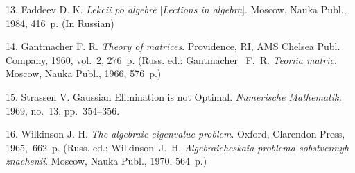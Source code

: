 {13. Faddeev D. K. \emph{Lekcii po algebre $[$Lections in
algebra$]$}. Moscow, Nauka Publ., 1984, 416~p. (In Russian)

14. Gantmacher F. R. {\it Theory of matrices}. Providence, RI, AMS
Chelsea Publ. Company, 1960, vol.~2, 276~p. (Russ. ed.:
Gantmacher~ F.~R. {\it Teoriia matric}. Moscow, Nauka Publ., 1966,
576~p.)

15. Strassen V. Gaussian Elimination is not Optimal.
\emph{Numerische Mathematik.} 1969, no.~13, pp.~354--356.

16. Wilkinson J. H. {\it The algebraic eigenvalue problem}.
Oxford, Clarendon Press, 1965,~662~p. (Russ. ed.: Wilkinson~J.~H.
{\it Algebraicheskaia problema sobstvennyh znachenii}. Moscow,
Nauka Publ., 1970, 564~p.)




}
